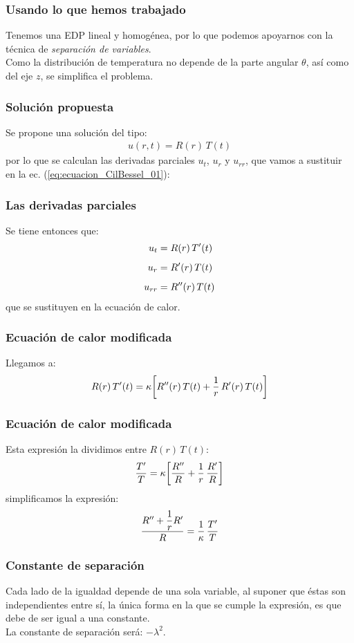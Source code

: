 \documentclass[12pt]{beamer}
\begin{document}
\begin{frame}
\frametitle{Usando lo que hemos trabajado}
Tenemos una EDP lineal y homogénea, por lo que podemos apoyarnos con la técnica de \emph{separación de variables}.
\\
\bigskip
\pause
Como la distribución de temperatura no depende  de la parte angular $\theta$, así como del eje $z$, se simplifica el problema.
\end{frame}
\begin{frame}
\frametitle{Solución propuesta}
Se propone una solución del tipo:
\begin{align*}
u(r, t) = R(r) \, T(t)
\end{align*}
\pause
por lo que se calculan las derivadas parciales $u_{t}$, $u_{r}$ y $u_{rr}$, que vamos a sustituir en la ec. (\ref{eq:ecuacion_CilBessel_01}):
\end{frame}
\begin{frame}
\frametitle{Las derivadas parciales}
Se tiene entonces que:
\begin{align*}
u_{t} &= R(r) \, {T}^{\prime}(t) \\[0.5em]
u_{r} &= {R}^{\prime}(r) \, {T}(t) \\[0.5em]
u_{rr} &= {R}^{\prime \prime}(r) \, {T}(t)
\end{align*}
que se sustituyen en la ecuación de calor.
\end{frame}
\begin{frame}
\frametitle{Ecuación de calor modificada}
Llegamos a:
\begin{align*}
R(r) \, {T}^{\prime}(t) = \kappa \bigg[ {R}^{\prime \prime}(r) \, {T}(t) + \dfrac{1}{r} \, {R}^{\prime}(r) \, {T}(t) \bigg]
\end{align*}
\end{frame}
\begin{frame}
\frametitle{Ecuación de calor modificada}
Esta expresión la dividimos entre $R(r) \, T(t)$:
\begin{align*}
\dfrac{{T}^{\prime}}{T} = \kappa \bigg[ \dfrac{{R}^{\prime \prime}}{R} + \dfrac{1}{r} \, \dfrac{{R}^{\prime}}{R} \bigg]
\end{align*}
\pause
simplificamos la expresión:
\begin{align*}
\dfrac{{R}^{\prime \prime} + \dfrac{1}{r} {R}^{\prime}}{R} = \dfrac{1}{\kappa} \, \dfrac{{T}^{\prime}}{T}
\end{align*}
\end{frame}
\begin{frame}
\frametitle{Constante de separación}
Cada lado de la igualdad depende de una sola variable, al suponer que éstas son independientes entre sí, la única forma en la que se cumple la expresión, es que debe de ser igual a una constante.
\pause
\\
\bigskip
La constante de separación será: $-\lambda^{2}$.
\end{frame}
\end{document}

